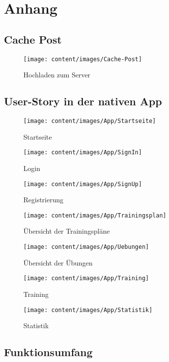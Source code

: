 \chapter{Anhang}
\label{cha:anhang}





\section{Cache Post}
\label{sec:cachePost}

\begin{figure}[!h]
\centering
\texttt{[image: content/images/Cache-Post]}
\caption{Hochladen zum Server}
\label{pic:cachePost}
\end{figure}

\section{User-Story in der nativen App}
\label{sec:UserStory}
\begin{figure}[!h]
\centering
\texttt{[image: content/images/App/Startseite]}
\caption{Startseite}
\label{pic:natAppStartseite}
\end{figure}
\begin{figure}[!h]
\centering
\texttt{[image: content/images/App/SignIn]}
\caption{Login}
\label{pic:natAppLogin}
\end{figure}
\begin{figure}[!h]
\centering
\texttt{[image: content/images/App/SignUp]}
\caption{Registrierung}
\label{pic:natAppRegistrierung}
\end{figure}
\begin{figure}[!h]
\centering
\texttt{[image: content/images/App/Trainingsplan]}
\caption{Übersicht der Trainingspläne}
\label{pic:natAppTrainingspläne}
\end{figure}
\begin{figure}[!h]
\centering
\texttt{[image: content/images/App/Uebungen]}
\caption{{\"U}bersicht der {\"U}bungen}
\label{pic:natAppÜbungen}
\end{figure}
\begin{figure}[!h]
\centering
\texttt{[image: content/images/App/Training]}
\caption{Training}
\label{pic:natAppTraining}
\end{figure}
\begin{figure}[!h]
\centering
\texttt{[image: content/images/App/Statistik]}
\caption{Statistik}
\label{pic:natAppStatistik}
\end{figure}

\section{Funktionsumfang}
\label{natAppFunktionen}
